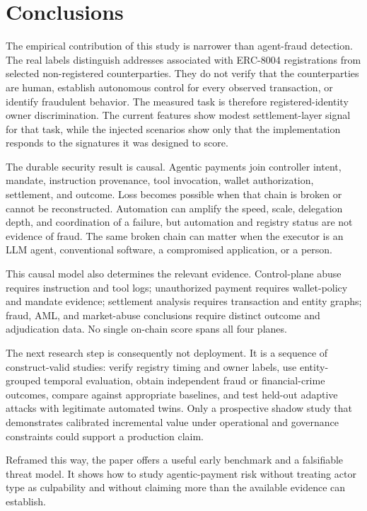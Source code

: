
\section{Conclusions}\label{sec:conclusions}

The empirical contribution of this study is narrower than agent-fraud
detection.  The real labels distinguish addresses associated with ERC-8004
registrations from selected non-registered counterparties.  They do not verify
that the counterparties are human, establish autonomous control for every
observed transaction, or identify fraudulent behavior.  The measured task is
therefore registered-identity owner discrimination.  The current features show
modest settlement-layer signal for that task, while the injected scenarios show
only that the implementation responds to the signatures it was designed to
score.

The durable security result is causal.  Agentic payments join controller intent,
mandate, instruction provenance, tool invocation, wallet authorization,
settlement, and outcome.  Loss becomes possible when that chain is broken or
cannot be reconstructed.  Automation can amplify the speed, scale, delegation
depth, and coordination of a failure, but automation and registry status are
not evidence of fraud.  The same broken chain can matter when the executor is an
LLM agent, conventional software, a compromised application, or a person.

This causal model also determines the relevant evidence.  Control-plane abuse
requires instruction and tool logs; unauthorized payment requires wallet-policy
and mandate evidence; settlement analysis requires transaction and entity
graphs; fraud, AML, and market-abuse conclusions require distinct outcome and
adjudication data.  No single on-chain score spans all four planes.

The next research step is consequently not deployment.  It is a sequence of
construct-valid studies: verify registry timing and owner labels, use
entity-grouped temporal evaluation, obtain independent fraud or financial-crime
outcomes, compare against appropriate baselines, and test held-out adaptive
attacks with legitimate automated twins.  Only a prospective shadow study that
demonstrates calibrated incremental value under operational and governance
constraints could support a production claim.

Reframed this way, the paper offers a useful early benchmark and a falsifiable
threat model.  It shows how to study agentic-payment risk without treating actor
type as culpability and without claiming more than the available evidence can
establish.
